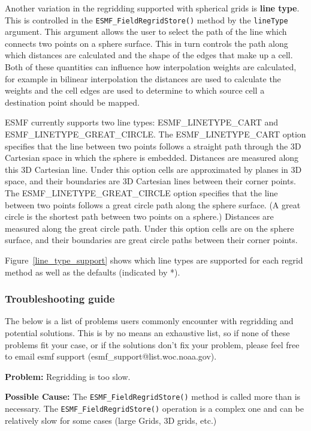  Another variation in the regridding supported with spherical grids is {\bf line type}. This is controlled in the
{\tt ESMF\_FieldRegridStore()} method by the {\tt lineType} argument. This argument allows the user to select the path of the line which connects
two points on a sphere surface. This in turn controls the path along which distances are calculated and the shape of 
the edges that make up a cell. Both of these quantities can influence how interpolation weights are calculated, for example in
bilinear interpolation the distances are used to calculate the weights and the cell edges are used to determine to which source 
cell a destination point should be mapped. 

ESMF currently supports two line types: ESMF\_LINETYPE\_CART and ESMF\_LINETYPE\_GREAT\_CIRCLE. The ESMF\_LINETYPE\_CART option 
specifies that the line between two points follows a straight path through the 3D Cartesian space in which the sphere is embedded.
Distances are measured along 
this 3D Cartesian line. Under this option cells are approximated by planes in 3D space, and their boundaries are 3D Cartesian lines
between their corner points.  The ESMF\_LINETYPE\_GREAT\_CIRCLE option specifies that the line between two points follows
a great circle path along the sphere surface. (A great circle is the shortest path between two points on a sphere.) 
Distances are measured along the great circle path. Under this option cells are on the sphere surface, and their boundaries 
are great circle paths between their corner points. 

Figure~\ref{line_type_support} shows which line types are supported for each regrid method as well as the defaults (indicated by *). 

\subsubsection{Troubleshooting guide}

 The below is a list of problems users commonly encounter with regridding and potential solutions. 
 This is by no means an exhaustive list, so if none of these problems fit your case, or if the solutions
 don't fix your problem, please feel free to email esmf support (esmf\_support@list.woc.noaa.gov).

 \bigskip
 
 {\bf Problem:} Regridding is too slow.

 \medskip

 {\bf Possible Cause:} The {\tt ESMF\_FieldRegridStore()} method is called more than is necessary. \newline
 The {\tt ESMF\_FieldRegridStore()} operation is a complex one and can be 
 relatively slow for some cases (large Grids, 3D grids, etc.) 
 
